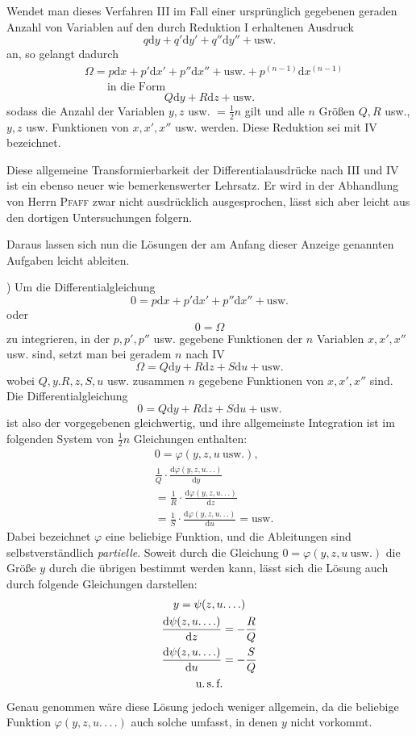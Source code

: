 Wendet man dieses Verfahren III im Fall einer ursprünglich gegebenen geraden Anzahl von Variablen auf den durch Reduktion I erhaltenen Ausdruck
\[
q\mathrm{d}y+q'\mathrm{d}y'+q''\mathrm{d}y''+\mathrm{usw.}
\]
an, so gelangt dadurch
\[
\begin{aligned}&\Omega=p\mathrm{d}x+p'\mathrm{d}x'+p''\mathrm{d}x''+\mathrm{usw.}
+p^{(n-1)}\mathrm{d}x^{(n-1)}\\&\qquad\text{in die Form}\end{aligned}
\]
\[
Q\mathrm{d}y+R\mathrm{d}z+\mathrm{usw.}
\]
sodass die Anzahl der Variablen $y,z$ usw. $=\frac12 n$ gilt und alle $n$ Größen $Q,R$ usw., $y,z$ usw. Funktionen von $x,x',x''$ usw. werden. Diese Reduktion sei mit IV bezeichnet.

Diese allgemeine Transformierbarkeit der Differentialausdrücke nach III und IV ist ein ebenso neuer wie bemerkenswerter Lehrsatz. Er wird in der Abhandlung von Herrn \textsc{Pfaff} zwar nicht ausdrücklich ausgesprochen, lässt sich aber leicht aus den dortigen Untersuchungen folgern.

Daraus lassen sich nun die Lösungen der am Anfang dieser Anzeige genannten Aufgaben leicht ableiten.

) Um die Differentialgleichung
\[
0=p\mathrm{d}x+p'\mathrm{d}x'+p''\mathrm{d}x''+\mathrm{usw.}
\]
oder
\[
0=\Omega
\]
zu integrieren, in der $p,p',p''$ usw. gegebene Funktionen der $n$ Variablen $x,x',x''$ usw. sind, setzt man bei geradem $n$ nach IV
\[
\Omega=Q\mathrm{d}y+R\mathrm{d}z+S\mathrm{d}u+\mathrm{usw.}
\]
wobei $Q,y.R,z,S,u$ usw. zusammen $n$ gegebene Funktionen von $x,x',x''$ sind. Die Differentialgleichung
\[
0=Q\mathrm{d}y+R\mathrm{d}z+S\mathrm{d}u+\mathrm{usw.}
\]
ist also der vorgegebenen gleichwertig, und ihre allgemeinste Integration ist im folgenden System von $\frac12 n$ Gleichungen enthalten:
\[
\begin{aligned}&0=\varphi(y,z,u\ \mathrm{usw.}),\\&
\frac1Q\cdot\frac{\mathrm{d}\varphi(y,z,u.\,.\,.)}{\mathrm{d}y}
\\&=\frac1R\cdot\frac{\mathrm{d}\varphi(y,z,u.\,.\,.)}{\mathrm{d}z}
\\&=\frac1S\cdot\frac{\mathrm{d}\varphi(y,z,u.\,.\,.)}{\mathrm{d}u}=\mathrm{usw.}\end{aligned}
\]
Dabei bezeichnet $\varphi$ eine beliebige Funktion, und die Ableitungen sind selbstverständlich \textit{partielle}. Soweit durch die Gleichung
$0=\varphi(y,z,u\ \mathrm{usw.})$
die Größe $y$ durch die übrigen bestimmt werden kann, lässt sich die Lösung auch durch folgende Gleichungen darstellen:
\[
\begin{gathered}
y=\psi(z,u.\,.\,.\,.)\\
\frac{\mathrm{d}\psi(z,u.\,.\,.\,.)}{\mathrm{d}z}=-\frac RQ\\
\frac{\mathrm{d}\psi(z,u.\,.\,.\,.)}{\mathrm{d}u}=-\frac SQ\\
\text{u.\,s.\,f.}
\end{gathered}
\]
Genau genommen wäre diese Lösung jedoch weniger allgemein, da die beliebige Funktion $\varphi(y,z,u.\,.\,.\,.)$ auch solche umfasst, in denen $y$ nicht vorkommt.

